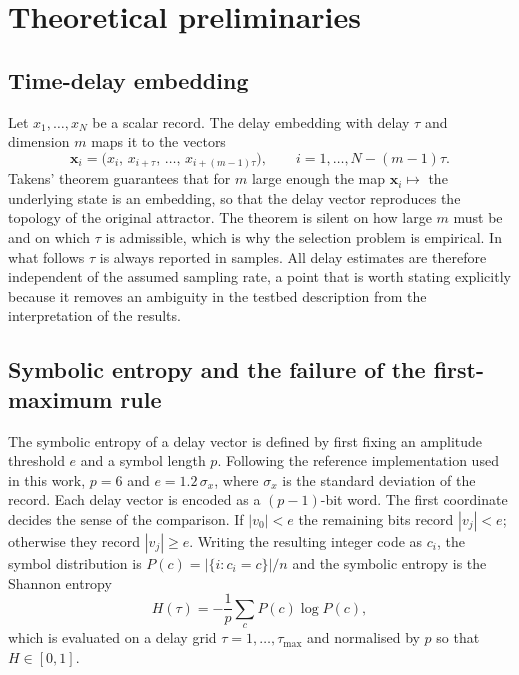 \documentclass[10pt,a4paper,twocolumn]{article}
\begin{document}
\section{Theoretical preliminaries}
\label{sec:theory}

\subsection{Time-delay embedding}

Let $x_1,\dots,x_N$ be a scalar record.  The delay embedding with delay
$\tau$ and dimension $m$ maps it to the vectors
\begin{equation}
\mathbf{x}_i = \bigl(x_i,\, x_{i+\tau},\, \dots,\, x_{i+(m-1)\tau}\bigr),
\qquad i = 1,\dots,N-(m-1)\tau .
\label{eq:embed}
\end{equation}
Takens' theorem \citep{takens1981} guarantees that for $m$ large enough the
map $\mathbf{x}_i \mapsto$ the underlying state is an embedding, so that the
delay vector reproduces the topology of the original attractor.  The theorem
is silent on how large $m$ must be and on which $\tau$ is admissible, which
is why the selection problem is empirical.  In what follows $\tau$ is always
reported in samples.  All delay estimates are therefore independent of the
assumed sampling rate, a point that is worth stating explicitly because it
removes an ambiguity in the testbed description from the interpretation of
the results.

\subsection{Symbolic entropy and the failure of the first-maximum rule}

The symbolic entropy of a delay vector is defined by first fixing an
amplitude threshold $e$ and a symbol length $p$.  Following the reference
implementation used in this work, $p=6$ and $e=1.2\,\sigma_x$, where
$\sigma_x$ is the standard deviation of the record.  Each delay vector is
encoded as a $(p-1)$-bit word.  The first coordinate decides the sense of the
comparison.  If $|v_0| < e$ the remaining bits record $|v_j| < e$; otherwise
they record $|v_j| \ge e$.  Writing the resulting integer code as $c_i$, the
symbol distribution is $P(c) = |\{i : c_i = c\}| / n$ and the symbolic
entropy is the Shannon entropy \citep{shannon1948}
\begin{equation}
H(\tau) = -\frac{1}{p}\sum_{c} P(c) \log P(c),
\label{eq:H}
\end{equation}
which is evaluated on a delay grid $\tau = 1,\dots,\tau_{\max}$ and
normalised by $p$ so that $H \in [0,1]$.
\end{document}
